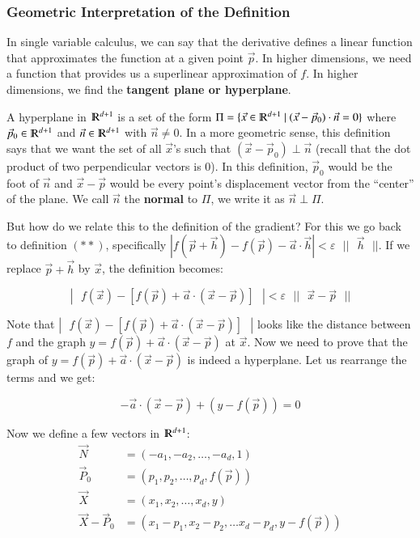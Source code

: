 \documentclass [12 pt, twoside] {book}
\newcommand\+{\text{ }}
\begin{document}
\subsubsection{Geometric Interpretation of the Definition}

In single variable calculus, we can say that the derivative defines a linear
function that approximates the function at a given point $\vec{p}$. In higher
dimensions, we need a function that provides us a superlinear approximation of
$f$. In higher dimensions, we find the \textbf{tangent plane or hyperplane}.

A hyperplane in $\varmathbb{R}^{d+1}$ is a set of the form $\Pi = \{\vec{x}
\in \varmathbb{R}^{d+1} \+|\+ (\vec{x} - \vec{p}_0) \cdot \vec{n} = 0\}$
where $\vec{p}_0 \in \varmathbb{R}^{d+1}$ and $\vec{n} \in \varmathbb{R}^{d+1}$
with $\vec{n} \neq 0$. In a more geometric sense, this definition says that we
want the set of all $\vec{x}$'s such that $(\vec{x} - \vec{p}_0)\perp\vec{n}$
(recall that the dot product of two perpendicular vectors is 0). In this
definition, $\vec{p}_0$ would be the foot of $\vec{n}$ and $\vec{x} - \vec{p}$
would be every point's displacement vector from the ``center'' of the plane. 
We call $\vec{n}$ the \textbf{normal} to $\Pi$, we write it as $\vec{n}\perp\Pi$.

But how do we relate this to the definition of the gradient? For this we go back
to definition $(**)$, specifically $|f(\vec{p} + \vec{h}) - f(\vec{p}) - \vec{a}
\cdot \vec{h}| < \varepsilon \+||\+\vec{h}\+||$. If we replace $\vec{p} + \vec{h}$
by $\vec{x}$, the definition becomes:

$$|\+f(\vec{x}) - [f(\vec{p}) + \vec{a}\cdot(\vec{x}-\vec{p})]\+| <
\varepsilon\+||\+\vec{x} - \vec{p}\+||$$

Note that $|\+f(\vec{x}) - [f(\vec{p}) + \vec{a} \cdot (\vec{x} - \vec{p})]\+|$
looks like the distance between $f$ and the graph $y = f(\vec{p}) + \vec{a} \cdot
(\vec{x} - \vec{p})$ at $\vec{x}$. Now we need to prove that the graph of $y =
f(\vec{p}) + \vec{a} \cdot (\vec{x} - \vec{p})$ is indeed a hyperplane. Let us
rearrange the terms and we get:

$$-\vec{a} \cdot (\vec{x} - \vec{p}) + (y - f(\vec{p})) = 0$$

Now we define a few vectors in $\varmathbb{R}^{d+1}$:
\begin{align*}
    \vec{N} &= (-a_1, -a_2, \dots, -a_d, 1)\\
    \vec{P}_0 &= (p_1, p_2, \dots, p_d, f(\vec{p}))\\
    \vec{X} &= (x_1, x_2, \dots, x_d, y)\\
    \vec{X} - \vec{P}_0 &= (x_1 - p_1, x_2 - p_2, \dots x_d - p_d, y - f(\vec{p}))
\end{align*}
\end{document}
